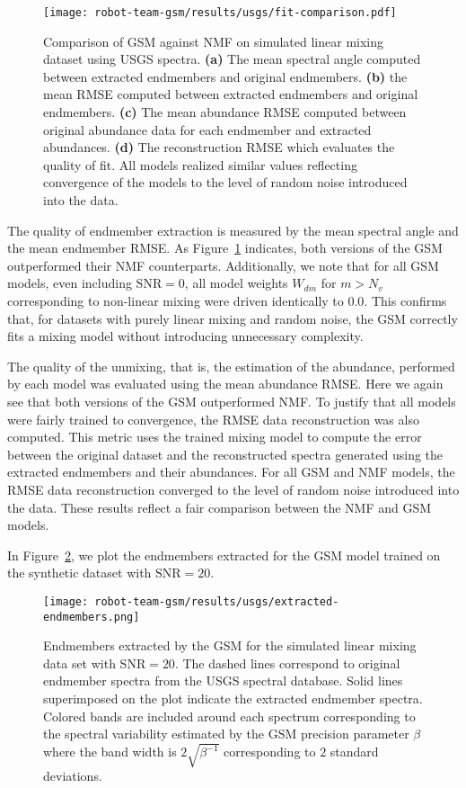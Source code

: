 \begin{figure}[H]
  \centering
  \texttt{[image: robot-team-gsm/results/usgs/fit-comparison.pdf]}
  \caption{Comparison of GSM against NMF on simulated linear mixing dataset
    using USGS spectra. \textbf{(a)} The mean spectral angle computed between
    extracted endmembers and original endmembers. \textbf{(b)} the mean RMSE
    computed between extracted endmembers and original endmembers. \textbf{(c)}
    The mean abundance RMSE computed between original abundance data for each
    endmember and extracted abundances. \textbf{(d)} The reconstruction RMSE
    which evaluates the quality of fit. All models realized similar values
    reflecting convergence of the models to the level of random noise introduced
    into the data.}
  \label{fig:usgs-fits}
\end{figure}

The quality of endmember extraction is measured by the mean spectral angle and
the mean endmember RMSE. As Figure~\ref{fig:usgs-fits} indicates, both versions
of the GSM outperformed their NMF counterparts. Additionally, we note that for
all GSM models, even including $\text{SNR}=0$, all model weights $W_{dm}$ for
$m>N_v$ corresponding to non-linear mixing were driven identically to $0.0$.
This confirms that, for datasets with purely linear mixing and random noise,
the GSM correctly fits a mixing model without introducing unnecessary
complexity.

The quality of the unmixing, that is, the estimation of the abundance, performed
by each model was evaluated using the mean abundance RMSE. Here we again see
that both versions of the GSM outperformed NMF. To justify that all models were
fairly trained to convergence, the RMSE data reconstruction was also computed.
This metric uses the trained mixing model to compute the error between the
original dataset and the reconstructed spectra generated using the extracted
endmembers and their abundances. For all GSM and NMF models, the RMSE data
reconstruction converged to the level of random noise introduced into the data.
These results reflect a fair comparison between the NMF and GSM models.

In Figure~\ref{fig:usgs-endmembers}, we plot the endmembers extracted for the
GSM model trained on the synthetic dataset with $\text{SNR}=20$.

\begin{figure}[H]
  \centering
  \texttt{[image: robot-team-gsm/results/usgs/extracted-endmembers.png]}
  \caption{Endmembers extracted by the GSM for the simulated linear mixing data
    set with SNR$=20$. The dashed lines correspond to original endmember spectra
    from the USGS spectral database. Solid lines superimposed on the plot
    indicate the extracted endmember spectra. Colored bands are included around
    each spectrum corresponding to the spectral variability estimated by the GSM
    precision parameter $\beta$ where the band width is $2\sqrt{\beta^{-1}}$
    corresponding to $2$ standard deviations.}
  \label{fig:usgs-endmembers}
\end{figure}

